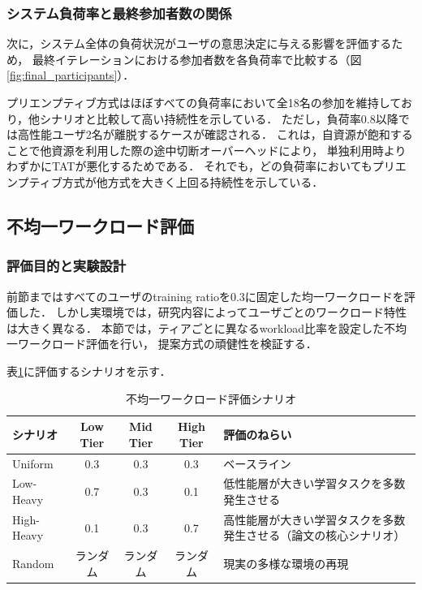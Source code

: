 \documentclass[12pt,a4paper]{jsarticle}
\begin{document}
\subsubsection{システム負荷率と最終参加者数の関係}

次に，システム全体の負荷状況がユーザの意思決定に与える影響を評価するため，
最終イテレーションにおける参加者数を各負荷率で比較する（図\ref{fig:final_participants}）．

プリエンプティブ方式はほぼすべての負荷率において全18名の参加を維持しており，他シナリオと比較して高い持続性を示している．
ただし，負荷率0.8以降では高性能ユーザ2名が離脱するケースが確認される．
これは，自資源が飽和することで他資源を利用した際の途中切断オーバーヘッドにより，
単独利用時よりわずかにTATが悪化するためである．
それでも，どの負荷率においてもプリエンプティブ方式が他方式を大きく上回る持続性を示している．

\subsection{不均一ワークロード評価}

\subsubsection{評価目的と実験設計}

前節まではすべてのユーザのtraining ratioを0.3に固定した均一ワークロードを評価した．
しかし実環境では，研究内容によってユーザごとのワークロード特性は大きく異なる．
本節では，ティアごとに異なるworkload比率を設定した不均一ワークロード評価を行い，
提案方式の頑健性を検証する．

表\ref{tab:hetero_scenarios}に評価するシナリオを示す．

\begin{table}[h]
  \centering
  \caption{不均一ワークロード評価シナリオ}
  \label{tab:hetero_scenarios}
  \begin{tabular}{lcccp{4.5cm}}
    \toprule
    シナリオ & Low Tier & Mid Tier & High Tier & 評価のねらい \\
    \midrule
    Uniform   & 0.3 & 0.3 & 0.3 & ベースライン \\
    Low-Heavy & 0.7 & 0.3 & 0.1 & 低性能層が大きい学習タスクを多数発生させる \\
    High-Heavy & 0.1 & 0.3 & 0.7 & 高性能層が大きい学習タスクを多数発生させる（論文の核心シナリオ） \\
    Random    & ランダム & ランダム & ランダム & 現実の多様な環境の再現 \\
    \bottomrule
  \end{tabular}
\end{table}
\end{document}
